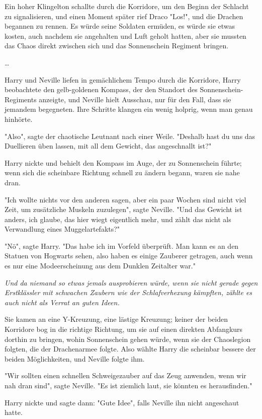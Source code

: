 {Ein hoher Klingelton schallte durch die Korridore, um den Beginn der Schlacht zu signalisieren, und einen Moment später rief Draco "Los!", und die Drachen begannen zu rennen. Es würde seine Soldaten ermüden, es würde sie etwas kosten, auch nachdem sie angehalten und Luft geholt hatten, aber sie mussten das Chaos direkt zwischen sich und das Sonnenschein Regiment bringen.

…

Harry und Neville liefen in gemächlichem Tempo durch die Korridore, Harry beobachtete den gelb-goldenen Kompass, der den Standort des Sonnenschein-Regiments anzeigte, und Neville hielt Ausschau, nur für den Fall, dass sie jemandem begegneten. Ihre Schritte klangen ein wenig holprig, wenn man genau hinhörte.

"Also", sagte der chaotische Leutnant nach einer Weile. "Deshalb hast du uns das Duellieren üben lassen, mit all dem Gewicht, das angeschnallt ist?"

Harry nickte und behielt den Kompass im Auge, der zu Sonnenschein führte; wenn sich die scheinbare Richtung schnell zu ändern begann, waren sie nahe dran.

"Ich wollte nichts vor den anderen sagen, aber ein paar Wochen sind nicht viel Zeit, um zusätzliche Muskeln zuzulegen", sagte Neville. "Und das Gewicht ist anders, ich glaube, das hier wiegt eigentlich mehr, und zählt das nicht als Verwandlung eines Muggelartefakts?"

"Nö", sagte Harry. "Das habe ich im Vorfeld überprüft. Man kann es an den Statuen von Hogwarts sehen, also haben es einige Zauberer getragen, auch wenn es nur eine Modeerscheinung aus dem Dunklen Zeitalter war."

\emph{Und da niemand so etwas jemals ausprobieren würde, wenn sie nicht gerade gegen Erstklässler mit schwachen Zaubern wie der Schlafverhexung kämpften, zählte es auch nicht als Verrat an guten Ideen.}

Sie kamen an eine Y-Kreuzung, eine lästige Kreuzung; keiner der beiden Korridore bog in die richtige Richtung, um sie auf einen direkten Abfangkurs dorthin zu bringen, wohin Sonnenschein gehen würde, wenn sie der Chaoslegion folgten, die der Drachenarmee folgte. Also wählte Harry die scheinbar bessere der beiden Möglichkeiten, und Neville folgte ihm.

"Wir sollten einen schnellen Schweigezauber auf das Zeug anwenden, wenn wir nah dran sind", sagte Neville. "Es ist ziemlich laut, sie könnten es herausfinden."

Harry nickte und sagte dann: "Gute Idee", falls Neville ihn nicht angeschaut hatte.

}
